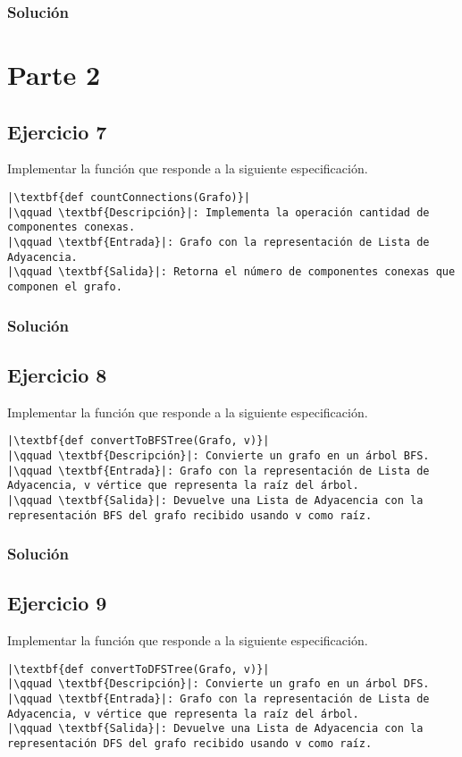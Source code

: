 \documentclass{article}
\begin{document}
\subsubsection*{Solución}


\section*{Parte 2}
\subsection*{Ejercicio 7}
Implementar la función que responde a la siguiente especificación.
\begin{lstlisting}
|\textbf{def countConnections(Grafo)}|
|\qquad \textbf{Descripción}|: Implementa la operación cantidad de componentes conexas.
|\qquad \textbf{Entrada}|: Grafo con la representación de Lista de Adyacencia.
|\qquad \textbf{Salida}|: Retorna el número de componentes conexas que componen el grafo.
\end{lstlisting}
\subsubsection*{Solución}


\subsection*{Ejercicio 8}
Implementar la función que responde a la siguiente especificación.
\begin{lstlisting}
|\textbf{def convertToBFSTree(Grafo, v)}|
|\qquad \textbf{Descripción}|: Convierte un grafo en un árbol BFS.
|\qquad \textbf{Entrada}|: Grafo con la representación de Lista de Adyacencia, v vértice que representa la raíz del árbol.
|\qquad \textbf{Salida}|: Devuelve una Lista de Adyacencia con la representación BFS del grafo recibido usando v como raíz.
\end{lstlisting}
\subsubsection*{Solución}


\subsection*{Ejercicio 9}
Implementar la función que responde a la siguiente especificación.
\begin{lstlisting}
|\textbf{def convertToDFSTree(Grafo, v)}|
|\qquad \textbf{Descripción}|: Convierte un grafo en un árbol DFS.
|\qquad \textbf{Entrada}|: Grafo con la representación de Lista de Adyacencia, v vértice que representa la raíz del árbol.
|\qquad \textbf{Salida}|: Devuelve una Lista de Adyacencia con la representación DFS del grafo recibido usando v como raíz.
\end{lstlisting}
\end{document}
